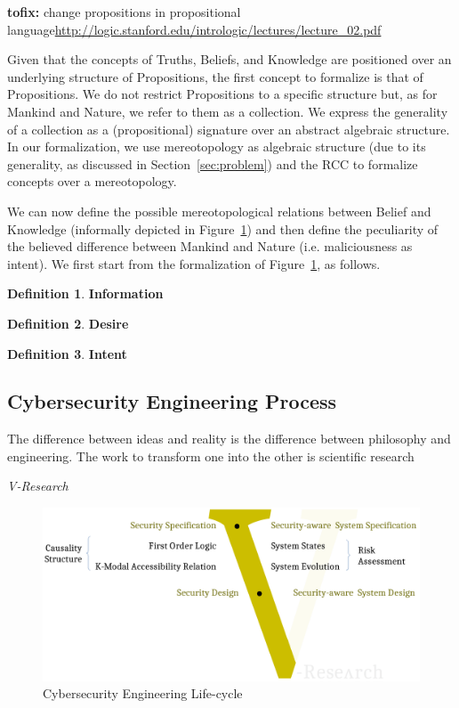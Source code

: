 \documentclass{article}
\newcommand{\fix}[2]{{\color{red} {\bf tofix:} #2}}
\theoremstyle{definition}
\newtheorem{definition}{Definition}[section]
\theoremstyle{corollary}
\theoremstyle{lemma}
\theoremstyle{theorem}
\theoremstyle{theorem}
\begin{document}
\fix{mr}{change propositions in propositional language\url{http://logic.stanford.edu/intrologic/lectures/lecture_02.pdf}}

Given that the concepts of Truths, Beliefs, and Knowledge are positioned over
an underlying structure of Propositions, the first concept to formalize is that
of Propositions. We do not restrict Propositions to a specific structure but,
as for Mankind and Nature, we refer to them as a collection.  We express the
generality of a collection as a (propositional) signature over an abstract
algebraic structure. In our formalization, we use mereotopology as algebraic
structure (due to its generality, as discussed in Section~\ref{sec:problem})
and the RCC to formalize concepts over a mereotopology. 

We can now define the possible mereotopological relations between Belief and
Knowledge (informally depicted in Figure~\ref{fig:knowledge-belief}) and then
define the peculiarity of the believed difference between Mankind and Nature 
(i.e. maliciousness as intent). 
We first start from the formalization of Figure~\ref{fig:knowledge-belief}, as
follows.  

\begin{definition}{\bf Information}\label{def:information}
\end{definition}
\begin{definition}{\bf Desire}\label{def:desire}
\end{definition}
\begin{definition}{\bf Intent}\label{def:intent}
\end{definition}


\subsection{Cybersecurity Engineering Process}\label{sec:process}
\epigraph{The difference between ideas and reality is the
difference between philosophy and engineering. The work to transform one into
the other is scientific research}{{\itshape V-Research}}
\begin{figure}[t]
	\centering
	\includegraphics[width=\textwidth]{vmodel.pdf}
	\caption{Cybersecurity Engineering Life-cycle}
	\label{fig:knowledge-belief}
\end{figure}
\end{document}
